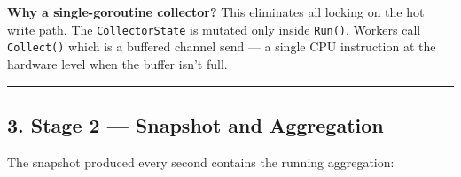 \documentclass[
]{article}
\begin{document}
\textbf{Why a single-goroutine collector?} This eliminates all locking
on the hot write path. The \texttt{CollectorState} is mutated only
inside \texttt{Run()}. Workers call \texttt{Collect()} which is a
buffered channel send --- a single CPU instruction at the hardware level
when the buffer isn't full.

\begin{center}\rule{0.5\linewidth}{0.5pt}\end{center}

\hypertarget{stage-2-snapshot-and-aggregation}{%
\subsection{3. Stage 2 --- Snapshot and
Aggregation}\label{stage-2-snapshot-and-aggregation}}

The snapshot produced every second contains the running aggregation:
\end{document}
